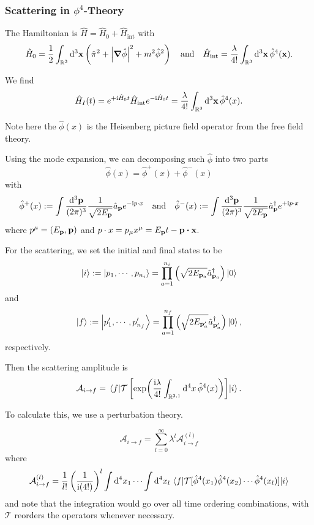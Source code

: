 \documentclass[a4paper,11pt]{article}
\begin{document}
	\subsubsection{Scattering in $\phi^4$-Theory}
	
	The Hamiltonian is $\hat H = \hat H_0 + \hat H _{\text{int}}$ with
	\[
		\hat H_0 = \frac{1}{2}\int _{\mathbb{R}^3} \dd[3]{\vb x} \left( \hat \pi^2 + \abs{\grad \hat \phi}^2 + m^2 \hat \phi^2 \right) \quad \text{and} \quad \hat H _{\text{int}} = \frac{\lambda}{4!} \int _{\mathbb{R}^3} \dd[3]{\vb x} \hat \phi^4(\vb x).
	\]
	
	We find 
	\begin{equation}
		\hat H_I(t) = e ^{+ \mathrm{i}\hat H_0 t} \hat H _{\text{int}} e ^{- \mathrm{i} \hat H_0 t} = \frac{\lambda}{4!} \int _{\mathbb{R}^3} \dd[3]{\vb x} \hat \phi^4(x).
		\label{eq:3.2.1}
	\end{equation}
	
	Note here the $\hat \phi(x)$ is the Heisenberg picture field operator from the free field theory.
	
	Using the mode expansion, we can decomposing such $\hat\phi$ into two parts
	\[
		\hat \phi(x) = \hat \phi^+(x) + \hat \phi^-(x)
	\]
	with
	\[
		\hat \phi^+(x) := \int \frac{\dd[3]{\vb p}}{(2\pi)^{3}} \frac{1}{\sqrt{2E _{\vb p}}} \hat a _{\vb p} e ^{- \mathrm{i} p \cdot x} \quad \text{and} \quad \hat \phi^-(x) := \int \frac{\dd[3]{\vb p}}{(2\pi)^{3}} \frac{1}{\sqrt{2E _{\vb p}}} \hat a^{\dagger} _{\vb p} e ^{+ \mathrm{i} p \cdot x}
	\]
	where $p^\mu = (E _{\vb p}, \vb p)$ and $p \cdot x = p_\mu x^\mu = E _{\vb p}t - \vb p \vdot \vb x$.
	
	For the scattering, we set the initial and final states to be 
	\[
		\ket{i} := \ket{p_1, \cdots, p _{n_i}} = \prod _{a = 1}^{n_i} \left( \sqrt{2 E _{\vb p _{a}}} \hat a^{\dagger} _{\vb p_a} \right) \ket{0}
	\]
	and
	\[
		\ket{f} := \ket{p'_1, \cdots, p'_{n_f}} = \prod _{a = 1}^{n_f} \left( \sqrt{2 E _{\vb p' _{a}}} \hat a^{\dagger} _{\vb p'_a} \right) \ket{0},
	\]
	respectively.

	Then the scattering amplitude is
	\[
		\mathcal{A}_{i \to f} = \mel{f}{\mathcal{T}\left[\exp(\frac{\mathrm{i} \lambda}{4!} \int _{\mathbb{R}^{3,1}} \dd[4]{x} \hat \phi^4(x))\right]}{i}.
	\]

	To calculate this, we use a perturbation theory. 

	\[
		\mathcal{A}_{i \to f} = \sum _{l = 0}^{\infty} \lambda^l \mathcal{A} _{i \to f}^{(l)}
	\]
	where
	\[
		\mathcal{A}_{i\to f}^{(l)} = \frac{1}{l!} \left( \frac{1}{\mathrm{i} (4!)} \right)^l \int \dd[4]{x_1} \cdots \int \dd[4]{x_l} \mel{f}{\mathcal{T}[\hat \phi^4(x_1) \hat \phi^4(x_2) \cdots \hat \phi^4(x_l)]}{i}
	\]
	and note that the integration would go over all time ordering combinations, with $\mathcal{T}$ reorders the operators whenever necessary. 
\end{document}
